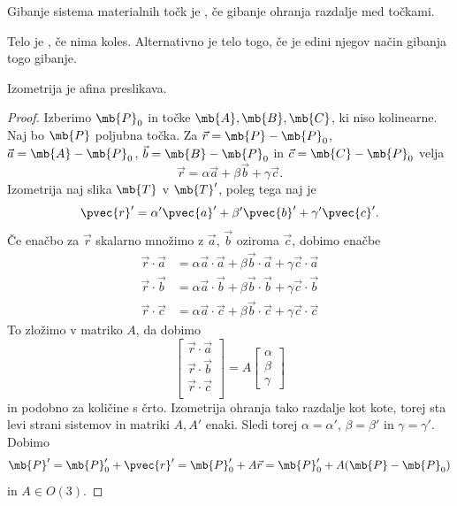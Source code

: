 
\begin{definicija}
  Gibanje sistema materialnih točk je , če gibanje ohranja razdalje
  med točkami.
\end{definicija}

\begin{definicija}
  Telo je , če nima koles.
  Alternativno je telo togo, če je edini njegov način gibanja togo gibanje.
\end{definicija}

\begin{izrek}
  Izometrija je afina preslikava.
\end{izrek}

\begin{proof}
  Izberimo $\mb{P}_0$ in točke $\mb{A}, \mb{B}, \mb{C}$, ki niso kolinearne.
  Naj bo $\mb{P}$ poljubna točka.
  Za $\vec{r} = \mb{P} - \mb{P}_0$, $\vec{a} = \mb{A} - \mb{P}_0$, $\vec{b} =
  \mb{B} - \mb{P}_0$ in $\vec{c} = \mb{C} - \mb{P}_0$ velja
  \[
	\vec{r} = \alpha \vec{a} + \beta \vec{b} + \gamma \vec{c}.
  \]
  Izometrija naj slika $\mb{T}$ v $\mb{T}'$, poleg tega naj je
  \[
	\pvec{r}' = \alpha' \pvec{a}' + \beta' \pvec{b}' + \gamma' \pvec{c}'.
  \]
  Če enačbo za $\vec{r}$ skalarno množimo z $\vec{a}$, $\vec{b}$ oziroma
  $\vec{c}$, dobimo enačbe
  \begin{align*}
	\vec{r} \cdot \vec{a} &= \alpha \vec{a} \cdot \vec{a} + \beta \vec{b} \cdot \vec{a} + \gamma \vec{c} \cdot \vec{a} \\
	\vec{r} \cdot \vec{b} &= \alpha \vec{a} \cdot \vec{b} + \beta \vec{b} \cdot \vec{b} + \gamma \vec{c} \cdot \vec{b} \\
	\vec{r} \cdot \vec{c} &= \alpha \vec{a} \cdot \vec{c} + \beta \vec{b} \cdot \vec{c} + \gamma \vec{c} \cdot \vec{c}
  \end{align*}
  To zložimo v matriko $A$, da dobimo
  \[
	\begin{bmatrix}
	  \vec{r} \cdot \vec{a} \\
	  \vec{r} \cdot \vec{b} \\
	  \vec{r} \cdot \vec{c} \\
	\end{bmatrix}
	= A
	\begin{bmatrix}
	  \alpha \\ \beta \\ \gamma
	\end{bmatrix}
  \]
  in podobno za količine s črto.
  Izometrija ohranja tako razdalje kot kote, torej sta levi strani sistemov in
  matriki $A, A'$ enaki.
  Sledi torej $\alpha = \alpha'$, $\beta = \beta'$ in $\gamma = \gamma'$.
  Dobimo
  \[
	\mb{P}' = \mb{P}_0' + \pvec{r}' = \mb{P}_0' + A \vec{r}
	= \mb{P}_0' + A(\mb{P} - \mb{P}_0)
  \]
  in $A \in O(3)$.
\end{proof}

